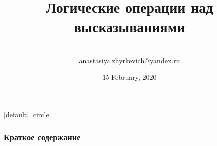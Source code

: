 \documentclass[10pt]{beamer}
\title[Дискретная математика]{Логические операции над высказываниями}
\theoremstyle{remark}
\theoremstyle{definition}
\begin{document}
\author[BSU]{
	\begin{tabular}{c} 
	\Large
	\\
    \footnotesize \href{mailto:anastasiya.zhyrkevich@yandex.ru}{anastasiya.zhyrkevich@yandex.ru}
\end{tabular}
\vspace{-4ex}}


\date{15 February, 2020}

\begin{noheadline}
\begin{frame}\maketitle\end{frame}
\end{noheadline}

[default]
[circle]

\begin{frame}
	\frametitle{Краткое содержание} %
	\tableofcontents %
\end{frame}
\end{document}
